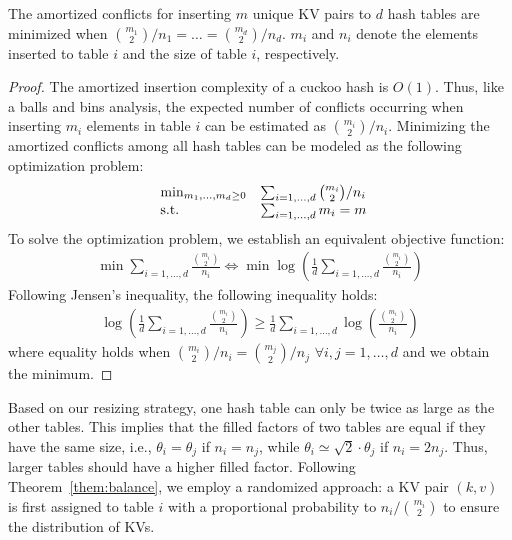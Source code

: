 \begin{theorem}\label{them:balance}
	The amortized conflicts for inserting $m$ unique KV pairs to $d$ hash tables are minimized when $\binom{m_1}{2}/n_1 = \ldots = \binom{m_d}{2}/n_d$. 
	$m_i$ and $n_i$ denote the elements inserted to table $i$ and the size of table $i$, respectively.  
\end{theorem}
\begin{proof}
	The amortized insertion complexity of a cuckoo hash is $O(1)$. Thus, like a balls and bins analysis, the expected number of conflicts occurring when inserting $m_i$ elements in table $i$ can be estimated as $\binom{m_i}{2}/n_i$. Minimizing the amortized conflicts among all hash tables can be modeled as the following optimization problem:
	\begin{equation}\label{eq:conflict-min}
	\begin{array}{ll@{}ll}
	\min_{m_1,\ldots,m_d \geq 0} & \sum_{i=1,\ldots,d} \binom{m_i}{2}/n_i \\
	\text{s.t.} & \sum_{i=1,\ldots,d} m_i = m
	\end{array}
	\end{equation}
	To solve the optimization problem, we establish an equivalent objective function:
	\begin{align*}
	\min \sum_{i=1,\ldots,d} \frac{\binom{m_i}{2}}{n_i} \Leftrightarrow \min \log(\frac{1}{d}\sum_{i=1,\ldots,d} \frac{\binom{m_i}{2}}{n_i})
	\end{align*}
	Following Jensen's inequality, the following inequality holds:
	\begin{align*}
	\log(\frac{1}{d}\sum_{i=1,\ldots,d} \frac{\binom{m_i}{2}}{n_i}) \geq \frac{1}{d}\sum_{i=1,\ldots,d}\log(\frac{\binom{m_i}{2}}{n_i})
	\end{align*}
	where equality holds when $\binom{m_i}{2}/n_i = \binom{m_j}{2}/n_j$ $\forall i,j = 1,\ldots,d$ and we obtain the minimum.
\end{proof}

Based on our resizing strategy, one hash table can only be twice as large as the other tables. 
This implies that the filled factors of two tables are equal if they have the same size, i.e., $\theta_i = \theta_j$ if $n_i = n_j$, 
while $\theta_i \simeq \sqrt{2}\cdot \theta_j$ if $n_i = 2n_j$. 
Thus, larger tables should have a higher filled factor. 
Following Theorem~\ref{them:balance},
we employ a randomized approach: 
a KV pair $(k,v)$ is first assigned to table $i$ with a proportional probability to $n_i/\binom{m_i}{2}$ to ensure the distribution of KVs.

